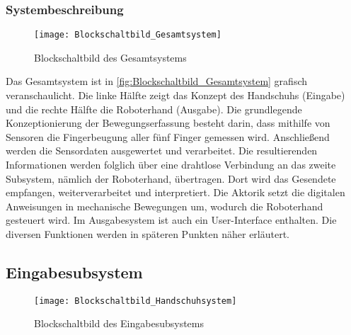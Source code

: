 \documentclass[titlepage,12pt,twoside]{article}
\begin{document}
\subsubsection{Systembeschreibung}

	\begin{figure}[H]
		\begin{center}
			\scalebox{1.2}
			{\texttt{[image: Blockschaltbild\_Gesamtsystem]}}
			\caption{Blockschaltbild des Gesamtsystems}
			\label{fig:Blockschaltbild_Gesamtsystem}		
		\end{center}
	\end{figure}

Das Gesamtsystem ist in \autoref{fig:Blockschaltbild_Gesamtsystem} grafisch veranschaulicht. Die linke Hälfte zeigt das Konzept des 
Handschuhs (Eingabe) und die rechte Hälfte die Roboterhand (Ausgabe). Die grundlegende Konzeptionierung der Bewegungserfassung 
besteht darin, dass mithilfe von Sensoren die Fingerbeugung aller fünf Finger gemessen wird. Anschließend werden die Sensordaten
ausgewertet und verarbeitet. Die resultierenden Informationen werden folglich über eine drahtlose Verbindung an das zweite 
Subsystem, nämlich der Roboterhand, übertragen. Dort wird das Gesendete empfangen, weiterverarbeitet und interpretiert. Die Aktorik
setzt die digitalen Anweisungen in mechanische Bewegungen um, wodurch die Roboterhand gesteuert wird. Im Ausgabesystem ist auch 
ein User-Interface enthalten. Die diversen Funktionen werden in späteren Punkten näher erläutert.

\subsection{Eingabesubsystem}
\label{chap:Eingabesubsystem}

	\begin{figure}[H]
		\begin{center}
			\scalebox{0.8}
			{\texttt{[image: Blockschaltbild\_Handschuhsystem]}}
			\caption{Blockschaltbild des Eingabesubsystems}
			\label{fig:Blockschaltbild_Handschuhsystem}			
		\end{center}
	\end{figure}
\end{document}
